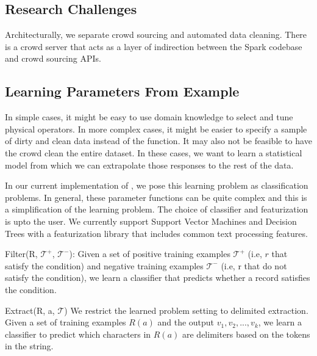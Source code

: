 \vspace{-0.25cm}


\iffalse
\subsection{Research Challenges}

Architecturally, we separate crowd sourcing and automated data cleaning.
There is a crowd server that acts as a layer of indirection between the Spark codebase and crowd sourcing APIs.




\subsection{Learning Parameters From Example}
In simple cases, it might be easy to use domain knowledge to select and tune physical operators. 
In more complex cases, it might be easier to specify a sample of dirty and clean data instead of the function.
It may also not be feasible to have the crowd clean the entire dataset.
In these cases, we want to learn a statistical model from which we can extrapolate those responses to the rest 
of the data.

In our current implementation of \projx, we pose this learning problem as classification problems.
In general, these parameter functions can be quite complex and this is a simplification of the learning problem.
The choice of classifier and featurization is upto the user. 
We currently support Support Vector Machines and Decision Trees with a featurization library that includes common text processing features.

\vspace{0.5em}

\noindent \textsf{Filter(R, $\mathcal{T}^+$, $\mathcal{T}^-$)}: Given a set of positive training examples $\mathcal{T}^+$ (i.e, $r$ that satisfy the condition) and
negative training examples $\mathcal{T}^-$ (i.e, r that do not satisfy the condition), we learn a classifier that predicts whether a record satisfies the condition. 

\vspace{0.5em}

\noindent \textsf{Extract(R, a, $\mathcal{T}$)} We restrict the learned problem setting to delimited extraction. Given a set of training examples $R(a)$ and the output $v_1,v_2,...,v_k$, we learn a classifier to predict which characters in $R(a)$ are delimiters based on the tokens in the string.

